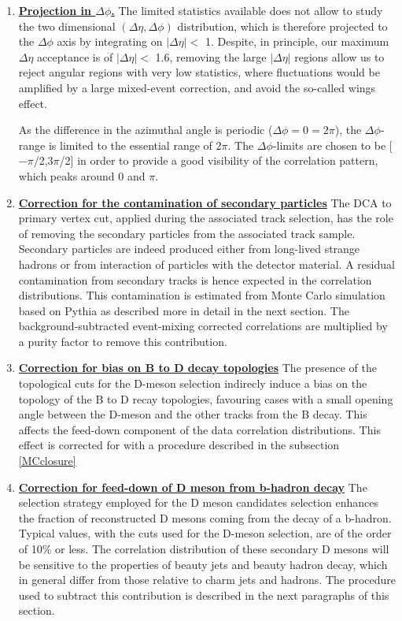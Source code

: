 \begin{enumerate}
\item
\underline{\bf Projection in $\Delta\phi$.}
The limited statistics available does not allow to study the two dimensional
$(\Delta\eta,\Delta\phi)$ distribution, which is therefore projected to the $\Delta\phi$ axis by integrating on $|\Delta\eta| <$ 1. Despite, in principle, our maximum $\Delta\eta$ acceptance is of $|\Delta\eta| <$ 1.6, removing the large $|\Delta\eta|$ regions allow us to reject angular regions with very low statistics, where fluctuations would be amplified by a large mixed-event correction, and avoid the so-called wings effect.

As the difference in the azimuthal angle is periodic ($\Delta \phi = 0 = 2\pi$), the $\Delta\phi$-range is limited to the essential range of 2$\pi$. The $\Delta \phi$-limits are chosen to be [$-\pi$/2,3$\pi$/2] in order to provide a good visibility of the correlation pattern, which peaks around 0 and $\pi$.

\item
\underline{\bf Correction for the contamination of secondary particles}
The DCA to primary vertex cut, applied during the associated track selection, has the role of removing the secondary particles from the associated track sample.
Secondary particles are indeed produced either from long-lived strange hadrons or from interaction of particles with the detector material. A residual contamination from secondary tracks is hence expected in the correlation distributions. This contamination is estimated from Monte Carlo simulation
based on Pythia as described more in detail in the next section. The background-subtracted
event-mixing corrected correlations are multiplied by a purity factor to remove this contribution.

\item
\underline{\bf Correction for bias on B to D decay topologies}
The presence of the topological cuts for the D-meson selection indirecly induce a bias on the topology of the B to D recay topologies, favouring cases with a small opening angle between the D-meson and the other tracks from the B decay. This affects the feed-down component of the data correlation distributions. This effect is corrected for with a procedure described in the subsection \ref{MCclosure}

\item
\underline{\bf Correction for feed-down of D meson from b-hadron decay}
The selection strategy employed for the D meson candidates selection %
enhances the fraction of reconstructed D mesons coming from the decay of a b-hadron. Typical values, with the cuts used for the D-meson selection, are of the order of 10\% or less. The correlation distribution of these secondary D mesons will be sensitive to the properties of beauty jets and beauty hadron decay, which in general differ from those relative to charm jets and hadrons. The procedure used to subtract this contribution is described in the next paragraphs of this section.


\end{enumerate}
